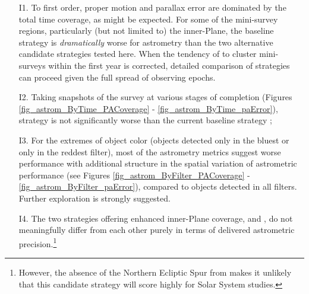 
\begin{itemize}

  \item[I1.] To first order, proper motion and parallax error are dominated by the total time coverage, as might be expected. For some of the mini-survey regions, particularly (but not limited to) the inner-Plane, the baseline strategy  is {\it dramatically} worse for astrometry than the two alternative candidate strategies tested here. When the tendency of \OpSim to cluster mini-surveys within the first year is corrected, detailed comparison of strategies can proceed given the full spread of observing epochs.

  \item[I2.] Taking snapshots of the survey at various stages of completion (Figures \ref{fig_astrom_ByTime_PACoverage} -  \ref{fig_astrom_ByTime_paError}), strategy  is not significantly worse than the current baseline strategy ;

\item[I3.] For the extremes of object color (objects detected
  only in the bluest or only in the reddest filter), most of the
  astrometry metrics suggest worse performance with additional
  structure in the spatial variation of astrometric performance (see
  Figures \ref{fig_astrom_ByFilter_PACoverage} -
  \ref{fig_astrom_ByFilter_paError}), compared to objects detected in all filters. Further exploration is strongly suggested.

\item[I4.] The two strategies offering enhanced inner-Plane coverage,  and , do not meaningfully differ from each other purely in terms of delivered astrometric precision.\footnote{However, the absence of the Northern Ecliptic Spur from  makes it unlikely that this candidate strategy will score highly for Solar System studies.}

\end{itemize}

